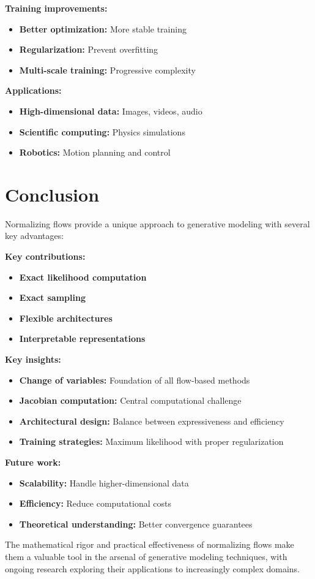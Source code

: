 \textbf{Training improvements:}
\begin{itemize}
    \item \textbf{Better optimization:} More stable training
    \item \textbf{Regularization:} Prevent overfitting
    \item \textbf{Multi-scale training:} Progressive complexity
\end{itemize}

\textbf{Applications:}
\begin{itemize}
    \item \textbf{High-dimensional data:} Images, videos, audio
    \item \textbf{Scientific computing:} Physics simulations
    \item \textbf{Robotics:} Motion planning and control
\end{itemize}

\section{Conclusion}

Normalizing flows provide a unique approach to generative modeling with several key advantages:

\textbf{Key contributions:}
\begin{itemize}
    \item \textbf{Exact likelihood computation}
    \item \textbf{Exact sampling}
    \item \textbf{Flexible architectures}
    \item \textbf{Interpretable representations}
\end{itemize}

\textbf{Key insights:}
\begin{itemize}
    \item \textbf{Change of variables:} Foundation of all flow-based methods
    \item \textbf{Jacobian computation:} Central computational challenge
    \item \textbf{Architectural design:} Balance between expressiveness and efficiency
    \item \textbf{Training strategies:} Maximum likelihood with proper regularization
\end{itemize}

\textbf{Future work:}
\begin{itemize}
    \item \textbf{Scalability:} Handle higher-dimensional data
    \item \textbf{Efficiency:} Reduce computational costs
    \item \textbf{Theoretical understanding:} Better convergence guarantees
\end{itemize}

The mathematical rigor and practical effectiveness of normalizing flows make them a valuable tool in the arsenal of generative modeling techniques, with ongoing research exploring their applications to increasingly complex domains.
